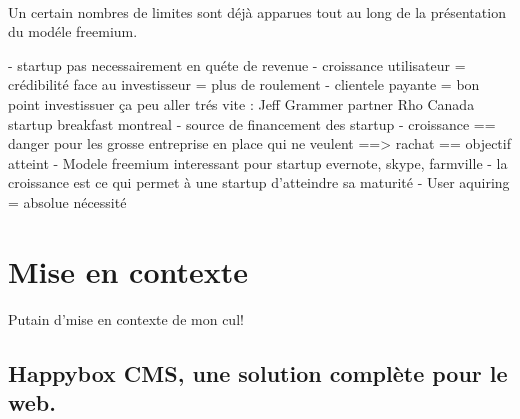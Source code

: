 \documentclass[11pt, a4paper ]{article}
\let\stdsection\section
\renewcommand\section{\newpage\stdsection}
\begin{document}
\paragraph{}%
Un certain nombres de limites sont déjà apparues tout au long de la présentation du modéle freemium. 





- startup pas necessairement en quéte de revenue
- croissance utilisateur = crédibilité face au investisseur = plus de roulement
- clientele payante = bon point investissuer ça peu aller trés vite : Jeff Grammer partner Rho Canada startup breakfast montreal
- source de financement des startup
- croissance == danger pour les grosse entreprise en place qui ne veulent ==> rachat == objectif atteint
- Modele freemium interessant pour startup evernote, skype, farmville
- la croissance est ce qui permet à une startup d'atteindre sa maturité
- User aquiring = absolue nécessité



		\section{Mise en contexte} %
Putain d'mise en contexte de mon cul!

			\subsection{Happybox CMS, une solution complète pour le web.}
\end{document}
